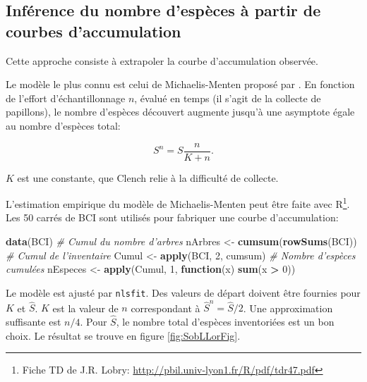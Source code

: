 \documentclass[
  11pt,
  french,
  a4paper,
  extrafontsizes,onecolumn,openright
  ]{memoir}
\newenvironment{Shaded}{\begin{snugshade}}{\end{snugshade}}
\newcommand{\CommentTok}[1]{\textcolor[rgb]{0.56,0.35,0.01}{\textit{#1}}}
\newcommand{\ControlFlowTok}[1]{\textcolor[rgb]{0.13,0.29,0.53}{\textbf{#1}}}
\newcommand{\DecValTok}[1]{\textcolor[rgb]{0.00,0.00,0.81}{#1}}
\newcommand{\KeywordTok}[1]{\textcolor[rgb]{0.13,0.29,0.53}{\textbf{#1}}}
\newcommand{\NormalTok}[1]{#1}
\newcommand{\OperatorTok}[1]{\textcolor[rgb]{0.81,0.36,0.00}{\textbf{#1}}}
\newcommand{\StringTok}[1]{\textcolor[rgb]{0.31,0.60,0.02}{#1}}
\begin{document}
\normalsize

\hypertarget{sec:RichesseSAC}{%
\subsection{Inférence du nombre d'espèces à partir de courbes d'accumulation}\label{sec:RichesseSAC}}

Cette approche consiste à extrapoler la courbe d'accumulation observée.

Le modèle le plus connu est celui de Michaelis-Menten \autocite{Michaelis1913} proposé par \textcite{Clench1979}.
En fonction de l'effort d'échantillonnage \(n\), évalué en temps (il s'agit de la collecte de papillons), le nombre d'espèces découvert augmente jusqu'à une asymptote égale au nombre d'espèces total:

\begin{equation} 
  S^{n} = S\frac{n}{K+n}.
\end{equation}

\(K\) est une constante, que Clench relie à la difficulté de collecte.

L'estimation empirique du modèle de Michaelis-Menten peut être faite avec R\footnote{Fiche TD de J.R. Lobry: \url{http://pbil.univ-lyon1.fr/R/pdf/tdr47.pdf}}.
Les 50 carrés de BCI sont utilisés pour fabriquer une courbe d'accumulation:

\scriptsize

\begin{Shaded}
\begin{Highlighting}[]
\KeywordTok{data}\NormalTok{(BCI)}
\CommentTok{# Cumul du nombre d'arbres}
\NormalTok{nArbres <-}\StringTok{ }\KeywordTok{cumsum}\NormalTok{(}\KeywordTok{rowSums}\NormalTok{(BCI))}
\CommentTok{# Cumul de l'inventaire}
\NormalTok{Cumul <-}\StringTok{ }\KeywordTok{apply}\NormalTok{(BCI, }\DecValTok{2}\NormalTok{, cumsum)}
\CommentTok{# Nombre d'espèces cumulées}
\NormalTok{nEspeces <-}\StringTok{ }\KeywordTok{apply}\NormalTok{(Cumul, }\DecValTok{1}\NormalTok{, }\ControlFlowTok{function}\NormalTok{(x) }\KeywordTok{sum}\NormalTok{(x }\OperatorTok{>}\StringTok{ }\DecValTok{0}\NormalTok{))}
\end{Highlighting}
\end{Shaded}

\normalsize

Le modèle est ajusté par \texttt{nlsfit}.
Des valeurs de départ doivent être fournies pour \(K\) et \(\hat{S}\).
\(K\) est la valeur de \(n\) correspondant à \(\hat{S}^{n} =\hat{S}/2\).
Une approximation suffisante est \(n/4\).
Pour \(\hat{S}\), le nombre total d'espèces inventoriées est un bon choix.
Le résultat se trouve en figure \ref{fig:SobLLorFig}.
\end{document}
